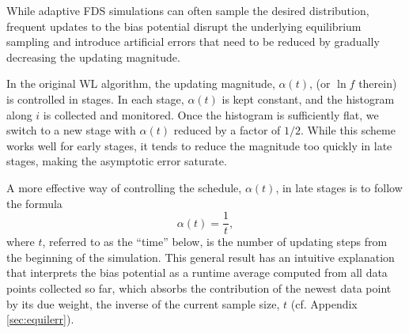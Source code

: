 \documentclass[preprint, superscriptaddress, floatfix]{revtex4-1}
\begin{document}



While adaptive FDS simulations
can often sample the desired distribution,
frequent updates to the bias potential
disrupt the underlying equilibrium sampling
and introduce artificial errors that need to be
reduced by gradually decreasing the updating magnitude\cite{
  belardinelli2007, *belardinelli2007jcp, *belardinelli2008, *belardinelli2016,
  zhou2005, morozov2007, zhou2008,
  laio2005, bussi2006, poulain2006, liang2007,
  crespo2010, *atchade2011, *fort2015}.


In the original WL algorithm\cite{
wang2001, wang2001pre},
the updating magnitude, $\alpha(t)$,
(or $\ln f$ therein)
is controlled in stages.
%
In each stage, $\alpha(t)$
is kept constant,
and the histogram along $i$
is collected and monitored.
%
Once the histogram is sufficiently flat,
we switch to a new stage
with $\alpha(t)$ reduced by a factor of $1/2$\cite{
wang2001, wang2001pre}.
%
While this scheme works well for early stages,
it tends to reduce the magnitude
too quickly in late stages, making the asymptotic error
saturate\cite{
belardinelli2007, *belardinelli2007jcp, *belardinelli2008, *belardinelli2016}.


A more effective way
of controlling the schedule, $\alpha(t)$,
in late stages
is to follow the formula
%
\begin{equation}
  \alpha(t) = \frac{1}{t},
  \label{eq:alpha_invt}
\end{equation}
%
where $t$,
referred to as the ``time'' below,
is the number of updating steps
from the beginning of the simulation\cite{
belardinelli2007, *belardinelli2007jcp, *belardinelli2008, *belardinelli2016,
morozov2007, zhou2008,
komura2012, *caparica2012, *caparica2014}.
%
This general result\cite{
  robbins1951, pellegrini2014}
has an intuitive explanation\cite{
  marsili2006, barducci2008}
that interprets the bias potential
as a runtime average computed from all data points collected so far,
which absorbs the contribution of the newest data point
by its due weight,
the inverse of the current sample size, $t$
(cf. Appendix \ref{sec:equilerr}).
%
\end{document}
